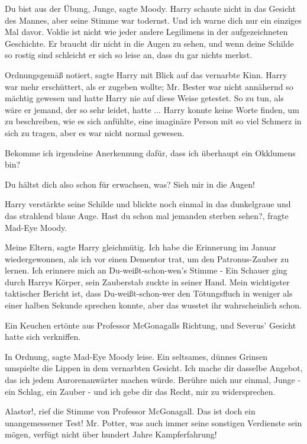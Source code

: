\glqq{}Du bist aus der Übung, Junge\grqq{}, sagte Moody. Harry schaute nicht in
das Gesicht des Mannes, aber seine Stimme war todernst. \glqq{}Und ich warne dich
nur ein einziges Mal davor. Voldie ist nicht wie jeder andere Legilimens in der
aufgezeichneten Geschichte. Er braucht dir nicht in die Augen zu sehen, und wenn
deine Schilde so rostig sind schleicht er sich so leise an, dass du gar nichts
merkst.\grqq{}

\glqq{}Ordnungsgemäß notiert\grqq{}, sagte Harry mit Blick auf das vernarbte
Kinn. Harry war mehr erschüttert, als er zugeben wollte; Mr. Bester war nicht
annähernd so mächtig gewesen und hatte Harry nie auf diese Weise getestet. So zu
tun, als wäre er jemand, der so sehr leidet, hatte ... Harry konnte keine Worte
finden, um zu beschreiben, wie es sich anfühlte, eine imaginäre Person mit so
viel Schmerz in sich zu tragen, aber es war nicht normal gewesen.

\glqq{}Bekomme ich irgendeine Anerkennung dafür, dass ich überhaupt ein Okklumens
bin?\grqq{}

\glqq{}Du hältst dich also schon für erwachsen, was? Sieh mir in die
Augen!\grqq{}

Harry verstärkte seine Schilde und blickte noch einmal in das dunkelgraue und
das strahlend blaue Auge. \glqq{}Hast du schon mal jemanden sterben
sehen?\grqq{}, fragte Mad-Eye Moody.

\glqq{}Meine Eltern\grqq{}, sagte Harry gleichmütig. \glqq{}Ich habe die
Erinnerung im Januar wiedergewonnen, als ich vor einen Dementor trat, um den
Patronus-Zauber zu lernen. Ich erinnere mich an Du-weißt-schon-wen's Stimme
-\grqq{} Ein Schauer ging durch Harrys Körper, sein Zauberstab zuckte in seiner
Hand. \glqq{}Mein wichtigster taktischer Bericht ist, dass Du-weißt-schon-wer den
Tötungsfluch in weniger als einer halben Sekunde sprechen konnte, aber das
wusstet ihr wahrscheinlich schon.\grqq{}

Ein Keuchen ertönte aus Professor McGonagalls Richtung, und Severus' Gesicht
hatte sich verkniffen.

\glqq{}In Ordnung\grqq{}, sagte Mad-Eye Moody leise. Ein seltsames, dünnes
Grinsen umspielte die Lippen in dem vernarbten Gesicht. \glqq{}Ich mache dir
dasselbe Angebot, das ich jedem Aurorenanwärter machen würde. Berühre mich nur
einmal, Junge - ein Schlag, ein Zauber - und ich gebe dir das Recht, mir zu
widersprechen.\grqq{}

\glqq{}Alastor!\grqq{}, rief die Stimme von Professor McGonagall. \glqq{}Das ist
doch ein unangemessener Test! Mr. Potter, was auch immer seine sonstigen
Verdienste sein mögen, verfügt nicht über hundert Jahre Kampferfahrung!\grqq{}

